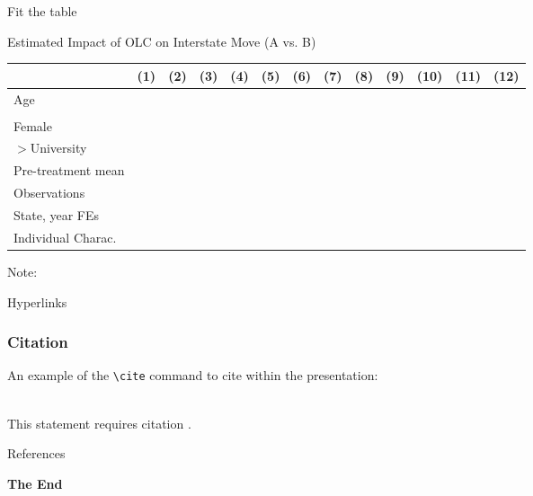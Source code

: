 \documentclass[aspectratio=169,xcolor=dvipsnames]{beamer}
\begin{document}
\begin{frame}{Fit the table}

\begin{center}
\def\sym#1{\ifmmode^{#1}\else\(^{#1}\)\fi}
\caption{Estimated Impact of OLC on Interstate Move (A vs. B)}
\begin{tabular}{l*{12}{c}}
\hline\hline
                &(1) & (2) & (3) & (4) & (5) & (6) &(7) & (8) & (9) & (10) & (11) & (12)\\
\hline
Age             & &  & &   &   &   &  &  &  & & & \\
                 & &  & &   &   &   &  & &  & & &  \\
Female             & &  & &   &   &   &  & &  & & &  \\
$>$University             & &  & &   &   &   &  &&  & & &   \\
\hline
Pre-treatment mean      & &  & &   &   &   &  & &  & & &  \\
Observations         & &  & &   &   &   &  & &  & & &  \\
\hline
State, year FEs       & &  & &   &   &   &  & &  & & &  \\
Individual Charac.       & &  & &   &   &   &  & &  & & &  \\
\hline\hline
\end{tabular} 
\end{center}
\scriptsize Note: 
\end{frame}


\begin{frame}{Hyperlinks}
\label{link}

\hyperlink{figure}{}

\end{frame}


\begin{frame}[fragile] %
    \frametitle{Citation}
    An example of the \verb|\cite| command to cite within the presentation:\\~

    This statement requires citation \cite{p1}.
\end{frame}


\begin{frame}{References}
    \footnotesize
    
    
\end{frame}


\begin{frame}
    \Huge{\centerline{\textbf{The End}}}
\end{frame}

\end{document}
